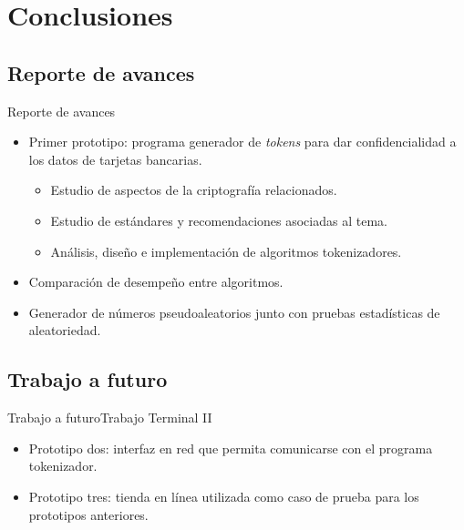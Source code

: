 %
%

\section{Conclusiones}

\subsection{Reporte de avances} %
\begin{frame}{Reporte de avances}

  \begin{itemize}
    \item<2-> Primer prototipo: programa generador de \textit{tokens} para
      dar confidencialidad a los datos de tarjetas bancarias.
      \begin{itemize}
        \item<3-> Estudio de aspectos de la criptografía relacionados.
        \item<4-> Estudio de estándares y recomendaciones asociadas al tema.
        \item<5-> Análisis, diseño e implementación de algoritmos tokenizadores.
      \end{itemize}
    \item<6-> Comparación de desempeño entre algoritmos.
    \item<7-> Generador de números pseudoaleatorios junto con pruebas
      estadísticas de aleatoriedad.
  \end{itemize}

\end{frame}

\subsection{Trabajo a futuro} %
\begin{frame}{Trabajo a futuro}{Trabajo Terminal II}

  \begin{itemize}
    \item<2-> Prototipo dos: interfaz en red que permita comunicarse con el
      programa tokenizador.
    \item<3-> Prototipo tres: tienda en línea utilizada como caso de prueba para
      los prototipos anteriores.
  \end{itemize}

\end{frame}
